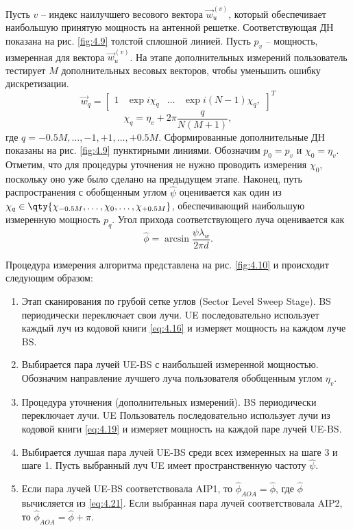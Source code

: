 Пусть $v$ -- индекс наилучшего весового вектора $\vec w_u^{(v)}$, который
обеспечивает наибольшую принятую мощность на антенной решетке.  Соответствующая
ДН показана на рис. \ref{fig:4.9} толстой сплошной линией. Пусть $p_v$ --
мощность, измеренная для вектора $\vec w_u^{(v)}$. На этапе дополнительных измерений
пользователь тестирует $M$ дополнительных весовых векторов, чтобы уменьшить
ошибку дискретизации.
\begin{equation}
    \label{eq:4.19}
    \vec w_q =
    \begin{bmatrix}
        1 & \exp {i \chi_q} & \dots & \exp{i(N-1)\chi_q},
    \end{bmatrix}^T
\end{equation}
\begin{equation}
    \chi_q = \eta_v + 2\pi \frac{q}{N(M+1)},
\end{equation}
где $q=-0.5M,\dots,-1,+1,\dots,+0.5M$. Сформированные дополнительные ДН показаны
на рис. \ref{fig:4.9} пунктирными линиями.  Обозначим $p_0= p_v$ и $\chi_0 =
\eta_v$. Отметим, что для процедуры уточнения не нужно проводить измерения
$\chi_0$, поскольку оно уже было сделано на предыдущем этапе.  Наконец, путь
распространения с обобщенным углом $\hat \psi$ оценивается как один из $\chi_q
\in \qty{\chi_{-0.5 M}, \dots, \chi_0, \dots, \chi_{+0.5M}}$, обеспечивающий
наибольшую измеренную мощность $p_q$. Угол прихода соответствующего луча
оценивается как
\begin{equation}
    \hat \phi = \arcsin{\frac{\psi \lambda_w}{2\pi d}}.
\end{equation}

Процедура измерения алгоритма представлена на рис. \ref{fig:4.10} и происходит следующим образом:

\begin{enumerate}[label=\textbf{Шаг \arabic*:}]
    \item Этап сканирования по грубой сетке углов (Sector Level Sweep Stage). 
          BS периодически переключает свои лучи. 
          UE последовательно использует каждый луч из кодовой книги \eqref{eq:4.16} 
          и измеряет мощность на каждом луче BS.
    \item Выбирается пара лучей UE-BS с наибольшей измеренной мощностью.
          Обозначим направление лучшего луча пользователя обобщенным углом $\eta_v$.
    \item Процедура уточнения (дополнительных измерений). BS периодически переключает лучи. UE
          Пользователь последовательно использует лучи из кодовой книги \eqref{eq:4.19} 
          и измеряет мощность на каждой паре лучей UE-BS.
    \item Выбирается лучшая пара лучей UE-BS среди всех измеренных на шаге 3 и шаге 1. 
    Пусть выбранный луч UE имеет пространственную частоту $\hat \psi$.
    \item Если пара лучей UE-BS соответствовала AIP1, то $\hat \phi_{AOA} = \hat \phi$, где 
    $\hat \phi$ вычисляется из \eqref{eq:4.21}.
    Если выбранная пара лучей соответствовала AIP2, то $\hat \phi_{AOA} = \hat \phi + \pi$. 
\end{enumerate}

